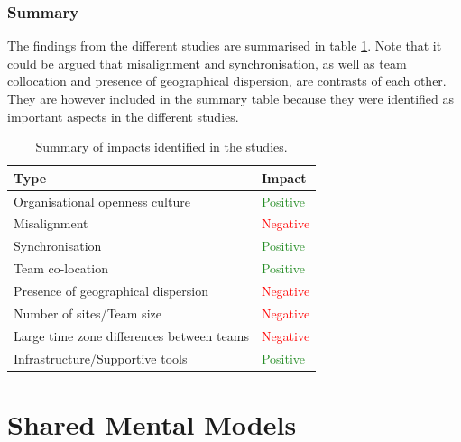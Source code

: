 \subsubsection{Summary}

The findings from the different studies are summarised in table \ref{summary}. Note that it could be argued that misalignment and synchronisation, as well as team collocation and presence of geographical dispersion, are contrasts of each other. They are however included in the summary table because they were identified as important aspects in the different studies.

\begin{table}
\begin{center}
    \begin{tabular}{ | p{8cm} | p{6cm} |}
    \hline
    \textbf{Type} & \textbf{Impact} \\ \hline
    Organisational openness culture & \textcolor{ForestGreen}{Positive} \\ \hline
    Misalignment & \textcolor{red}{Negative} \\ \hline
    Synchronisation & \textcolor{ForestGreen}{Positive} \\ \hline
    Team co-location & \textcolor{ForestGreen}{Positive} \\ \hline
    Presence of geographical dispersion & \textcolor{red}{Negative} \\ \hline
    Number of sites/Team size & \textcolor{red}{Negative} \\ \hline
    Large time zone differences between teams & \textcolor{red}{Negative} \\ \hline
    Infrastructure/Supportive tools & \textcolor{ForestGreen}{Positive} \\ \hline
    \end{tabular}
    \caption{Summary of impacts identified in the studies.}
    \label{summary}
\end{center}
\end{table}

\section{Shared Mental Models}



